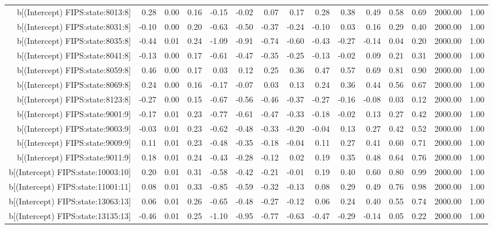 \begin{table}[ht]
\begin{tabular}{rrrrrrrrrrrrrrr}
  b[(Intercept) FIPS:state:8013:8] & 0.28 & 0.00 & 0.16 & -0.15 & -0.02 & 0.07 & 0.17 & 0.28 & 0.38 & 0.49 & 0.58 & 0.69 & 2000.00 & 1.00 \\ 
  b[(Intercept) FIPS:state:8031:8] & -0.10 & 0.00 & 0.20 & -0.63 & -0.50 & -0.37 & -0.24 & -0.10 & 0.03 & 0.16 & 0.29 & 0.40 & 2000.00 & 1.00 \\ 
  b[(Intercept) FIPS:state:8035:8] & -0.44 & 0.01 & 0.24 & -1.09 & -0.91 & -0.74 & -0.60 & -0.43 & -0.27 & -0.14 & 0.04 & 0.20 & 2000.00 & 1.00 \\ 
  b[(Intercept) FIPS:state:8041:8] & -0.13 & 0.00 & 0.17 & -0.61 & -0.47 & -0.35 & -0.25 & -0.13 & -0.02 & 0.09 & 0.21 & 0.31 & 2000.00 & 1.00 \\ 
  b[(Intercept) FIPS:state:8059:8] & 0.46 & 0.00 & 0.17 & 0.03 & 0.12 & 0.25 & 0.36 & 0.47 & 0.57 & 0.69 & 0.81 & 0.90 & 2000.00 & 1.00 \\ 
  b[(Intercept) FIPS:state:8069:8] & 0.24 & 0.00 & 0.16 & -0.17 & -0.07 & 0.03 & 0.13 & 0.24 & 0.36 & 0.44 & 0.56 & 0.67 & 2000.00 & 1.00 \\ 
  b[(Intercept) FIPS:state:8123:8] & -0.27 & 0.00 & 0.15 & -0.67 & -0.56 & -0.46 & -0.37 & -0.27 & -0.16 & -0.08 & 0.03 & 0.12 & 2000.00 & 1.00 \\ 
  b[(Intercept) FIPS:state:9001:9] & -0.17 & 0.01 & 0.23 & -0.77 & -0.61 & -0.47 & -0.33 & -0.18 & -0.02 & 0.13 & 0.27 & 0.42 & 2000.00 & 1.00 \\ 
  b[(Intercept) FIPS:state:9003:9] & -0.03 & 0.01 & 0.23 & -0.62 & -0.48 & -0.33 & -0.20 & -0.04 & 0.13 & 0.27 & 0.42 & 0.52 & 2000.00 & 1.00 \\ 
  b[(Intercept) FIPS:state:9009:9] & 0.11 & 0.01 & 0.23 & -0.48 & -0.35 & -0.18 & -0.04 & 0.11 & 0.27 & 0.41 & 0.60 & 0.71 & 2000.00 & 1.00 \\ 
  b[(Intercept) FIPS:state:9011:9] & 0.18 & 0.01 & 0.24 & -0.43 & -0.28 & -0.12 & 0.02 & 0.19 & 0.35 & 0.48 & 0.64 & 0.76 & 2000.00 & 1.00 \\ 
  b[(Intercept) FIPS:state:10003:10] & 0.20 & 0.01 & 0.31 & -0.58 & -0.42 & -0.21 & -0.01 & 0.19 & 0.40 & 0.60 & 0.80 & 0.99 & 2000.00 & 1.00 \\ 
  b[(Intercept) FIPS:state:11001:11] & 0.08 & 0.01 & 0.33 & -0.85 & -0.59 & -0.32 & -0.13 & 0.08 & 0.29 & 0.49 & 0.76 & 0.98 & 2000.00 & 1.00 \\ 
  b[(Intercept) FIPS:state:13063:13] & 0.06 & 0.01 & 0.26 & -0.65 & -0.48 & -0.27 & -0.12 & 0.06 & 0.24 & 0.40 & 0.55 & 0.74 & 2000.00 & 1.00 \\ 
  b[(Intercept) FIPS:state:13135:13] & -0.46 & 0.01 & 0.25 & -1.10 & -0.95 & -0.77 & -0.63 & -0.47 & -0.29 & -0.14 & 0.05 & 0.22 & 2000.00 & 1.00 \\ 

\end{tabular}
\end{table}
